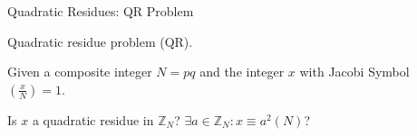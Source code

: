 \documentclass{beamer}
\begin{document}

\begin{frame}{Quadratic Residues: QR Problem}
	\begin{description}[Parameters]
		\item[Name] Quadratic residue problem (QR).
		\item[Parameters] Given a composite integer $N=pq$ and the integer $x$ with Jacobi Symbol $\left( \frac{x}{N} \right) = 1$.
		\item[Question] Is $x$ a quadratic residue in ${\mathbb Z}_N$? $\exists a\in {\mathbb Z}_N : x\equiv a^2 (N)$?
	\end{description}
\end{frame}

\end{document}
